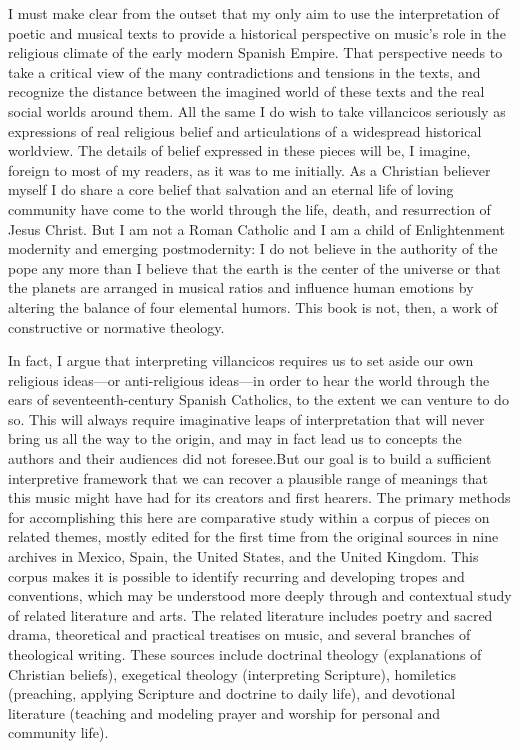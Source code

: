 I must make clear from the outset that my only aim to use the interpretation of
poetic and musical texts to provide a historical perspective on music's role in
the religious climate of the early modern Spanish Empire.
That perspective needs to take a critical view of the many contradictions and
tensions in the texts, and recognize the distance between the imagined world of
these texts and the real social worlds around them. 
All the same I do wish to take villancicos seriously as expressions of real
religious belief and articulations of a widespread historical worldview.
The details of belief expressed in these pieces will be, I imagine, foreign to
most of my readers, as it was to me initially.
As a Christian believer myself I do share a core belief that salvation and an 
eternal life of loving community have come to the world through the life,
death, and resurrection of Jesus Christ.
But I am not a Roman Catholic and I am a child of Enlightenment modernity and
emerging postmodernity: I do not believe in the authority of the pope any more
than I believe that the earth is the center of the universe or that the planets
are arranged in musical ratios and influence human emotions by altering the
balance of four elemental humors.
This book is not, then, a work of constructive or normative theology.

In fact, I argue that interpreting villancicos requires us to set aside our own
religious ideas---or anti-religious ideas---in order to hear the world through
the ears of seventeenth-century Spanish Catholics, to the extent we can venture
to do so.
This will always require imaginative leaps of interpretation that will never
bring us all the way to the origin, and may in fact lead us to concepts the
authors and their audiences did not foresee.
But our goal is to build a sufficient interpretive framework that we can
recover a plausible range of meanings that this music might have had for its
creators and first hearers.
The primary methods for accomplishing this here are comparative study within a
corpus of pieces on related themes, mostly edited for the first time from the
original sources in nine archives in Mexico, Spain, the United States, and the
United Kingdom.
This corpus makes it is possible to identify recurring and developing tropes
and conventions, which may be understood more deeply through and contextual
study of related literature and arts.
The related literature includes poetry and sacred drama, theoretical and
practical treatises on music, and several branches of theological writing.
These sources include doctrinal theology (explanations of Christian beliefs),
exegetical theology (interpreting Scripture), homiletics (preaching, applying
Scripture and doctrine to daily life), and devotional literature (teaching and
modeling prayer and worship for personal and community life).


